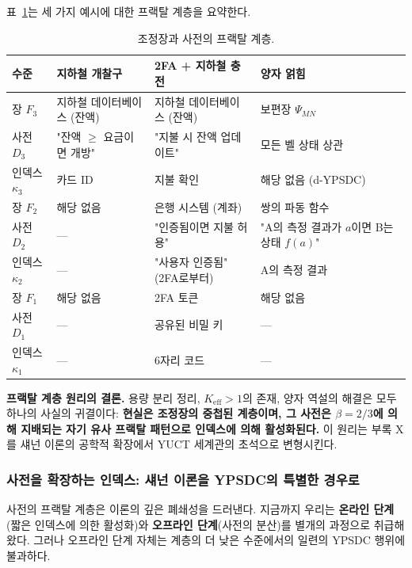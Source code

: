 \documentclass[12pt,a4paper]{article}
\begin{document}
	표~\ref{tab:fractal-examples}는 세 가지 예시에 대한 프랙탈 계층을 요약한다.
	
	\begin{table}[htbp]
		\centering
		\caption{조정장과 사전의 프랙탈 계층.}
		\label{tab:fractal-examples}
		\small
		\begin{tabular}{p{2.2cm} p{3.5cm} p{3.5cm} p{3.5cm}}
			\toprule
			\textbf{수준} & \textbf{지하철 개찰구} & \textbf{2FA + 지하철 충전} & \textbf{양자 얽힘} \\
			\midrule
			장 $F_3$ & 지하철 데이터베이스 (잔액) & 지하철 데이터베이스 (잔액) & 보편장 $\Psi_{MN}$ \\
			사전 $D_3$ & "잔액 $\ge$ 요금이면 개방" & "지불 시 잔액 업데이트" & 모든 벨 상태 상관 \\
			인덱스 $\kappa_3$ & 카드 ID & 지불 확인 & 해당 없음 (d-YPSDC) \\
			\midrule
			장 $F_2$ & 해당 없음 & 은행 시스템 (계좌) & 쌍의 파동 함수 \\
			사전 $D_2$ & --- & "인증됨이면 지불 허용" & "A의 측정 결과가 $a$이면 B는 상태 $f(a)$" \\
			인덱스 $\kappa_2$ & --- & "사용자 인증됨" (2FA로부터) & A의 측정 결과 \\
			\midrule
			장 $F_1$ & 해당 없음 & 2FA 토큰 & 해당 없음 \\
			사전 $D_1$ & --- & 공유된 비밀 키 & --- \\
			인덱스 $\kappa_1$ & --- & 6자리 코드 & --- \\
			\bottomrule
		\end{tabular}
	\end{table}
	
	\noindent
	\textbf{프랙탈 계층 원리의 결론.}
	용량 분리 정리, $K_{\mathrm{eff}}>1$의 존재, 양자 역설의 해결은 모두 하나의 사실의 귀결이다: \textbf{현실은 조정장의 중첩된 계층이며, 그 사전은 $\beta=2/3$에 의해 지배되는 자기 유사 프랙탈 패턴으로 인덱스에 의해 활성화된다.} 이 원리는 부록 X를 섀넌 이론의 공학적 확장에서 YUCT 세계관의 초석으로 변형시킨다.
	
	\subsubsection{사전을 확장하는 인덱스: 섀넌 이론을 YPSDC의 특별한 경우로}
	
	사전의 프랙탈 계층은 이론의 깊은 폐쇄성을 드러낸다. 지금까지 우리는 \textbf{온라인 단계}(짧은 인덱스에 의한 활성화)와 \textbf{오프라인 단계}(사전의 분산)를 별개의 과정으로 취급해 왔다. 그러나 오프라인 단계 자체는 계층의 더 낮은 수준에서의 일련의 YPSDC 행위에 불과하다.
	
\end{document}
